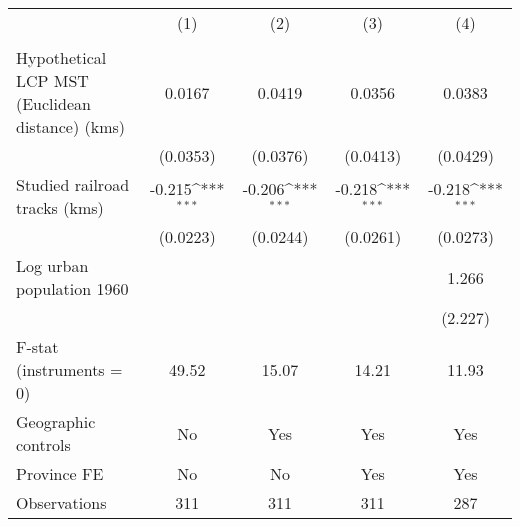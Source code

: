 {
\def\sym#1{\ifmmode^{#1}\else\(^{#1}\)\fi}
\begin{tabular}{l*{4}{c}}
\hline\hline
                &\multicolumn{1}{c}{(1)}&\multicolumn{1}{c}{(2)}&\multicolumn{1}{c}{(3)}&\multicolumn{1}{c}{(4)}\\
                &\multicolumn{1}{c}{}&\multicolumn{1}{c}{}&\multicolumn{1}{c}{}&\multicolumn{1}{c}{}\\
\hline
Hypothetical LCP MST (Euclidean distance) (kms)&   0.0167         &   0.0419         &   0.0356         &   0.0383         \\
                & (0.0353)         & (0.0376)         & (0.0413)         & (0.0429)         \\
[1em]
Studied railroad tracks (kms)&   -0.215\sym{***}&   -0.206\sym{***}&   -0.218\sym{***}&   -0.218\sym{***}\\
                & (0.0223)         & (0.0244)         & (0.0261)         & (0.0273)         \\
[1em]
Log urban population 1960&                  &                  &                  &    1.266         \\
                &                  &                  &                  &  (2.227)         \\
\hline
F-stat (instruments = 0)&    49.52         &    15.07         &    14.21         &    11.93         \\
Geographic controls&       No         &      Yes         &      Yes         &      Yes         \\
Province FE     &       No         &       No         &      Yes         &      Yes         \\
Observations    &      311         &      311         &      311         &      287         \\
\hline\hline
\end{tabular}
}
